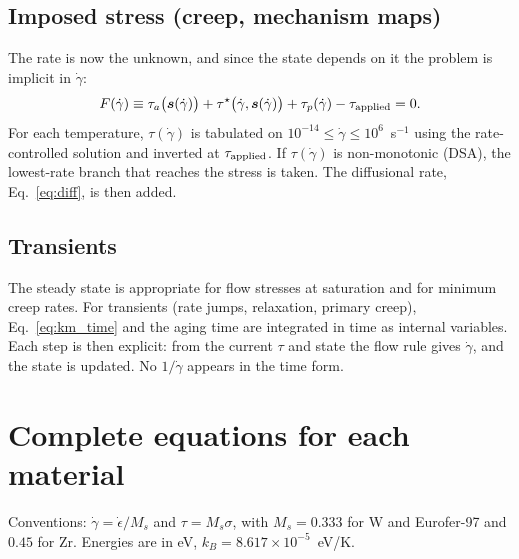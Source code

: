 \documentclass[11pt]{article}
\newcommand{\gd}{\dot\gamma}
\newcommand{\ts}{\tau^{\star}}
\numberwithin{equation}{section}
\begin{document}
\subsection{Imposed stress (creep, mechanism maps)}
The rate is now the unknown, and since the state depends on it the problem is implicit in $\gd$:
\begin{equation}
F(\gd)\equiv\tau_a\big(\bm s(\gd)\big)+\ts\big(\gd,\bm s(\gd)\big)+\tau_p(\gd)-\tau_{\rm applied}=0 .
\end{equation}
For each temperature, $\tau(\gd)$ is tabulated on $10^{-14}\le\gd\le10^6$~s$^{-1}$ using the rate-controlled solution and inverted at $\tau_{\rm applied}$. If $\tau(\gd)$ is non-monotonic (DSA), the lowest-rate branch that reaches the stress is taken. The diffusional rate, Eq.~\eqref{eq:diff}, is then added.

\subsection{Transients}
The steady state is appropriate for flow stresses at saturation and for minimum creep rates. For transients (rate jumps, relaxation, primary creep), Eq.~\eqref{eq:km_time} and the aging time are integrated in time as internal variables. Each step is then explicit: from the current $\tau$ and state the flow rule gives $\gd$, and the state is updated. No $1/\gd$ appears in the time form.

\section{Complete equations for each material}
Conventions: $\gd=\dot\epsilon/M_s$ and $\tau=M_s\sigma$, with $M_s=0.333$ for W and Eurofer-97 and $0.45$ for Zr. Energies are in eV, $k_B=8.617\times10^{-5}$~eV/K.
\end{document}
